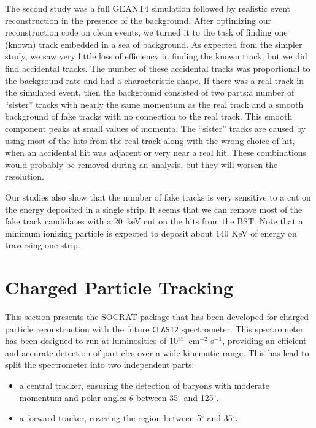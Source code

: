 The second study was a full GEANT4 simulation followed by realistic
event reconstruction in the presence of the background.  After optimizing
our reconstruction code on clean events, we turned it to the task of finding
one (known) track embedded in a sea of background.  As expected from the
simpler study, we saw very little loss of efficiency in finding the known
track, but we did find accidental tracks.  The number of these accidental
tracks was proportional to the background rate and had a characteristic
shape.  If there was a real track in the simulated event, then the background
consisted of two parts:a number of ``sister'' tracks with nearly the same
momentum as the real track and a smooth
background of fake tracks with no connection to the real track.  This smooth
component peaks at small values of momenta.  The ``sister'' tracks are caused
by using most of the hits from the real track along with the wrong choice
of hit, when an accidental hit was adjacent or very near a real hit.
These combinations would probably be removed during an analysis, but 
they will worsen the resolution.

Our studies also show that the number of fake tracks is very sensitive to a 
cut on the energy deposited in a single strip.  It seems that we can
remove most of the fake track candidates with a 20~keV cut on the hits 
from the BST.  Note that a minimum ionizing particle is expected to deposit 
about 140 KeV of energy on traversing one strip. 

\section{Charged Particle Tracking}

This section presents the SOCRAT package that has been developed for charged 
particle reconstruction with the future {\tt CLAS12} spectrometer.  This 
spectrometer has been designed to run at luminosities of 
10$^{35}$~cm$^{-2}$ s$^{-1}$, providing an efficient and accurate detection of 
particles over a wide kinematic range.  This has lead to split the spectrometer 
into two independent parts:

\begin{itemize}
\item a central tracker, ensuring the detection of baryons with moderate momentum 
and polar angles $\theta$ between 35$^\circ$ and 125$^\circ$.
\item a forward tracker, covering the region between 5$^\circ$ and 35$^\circ$.
\end{itemize}

